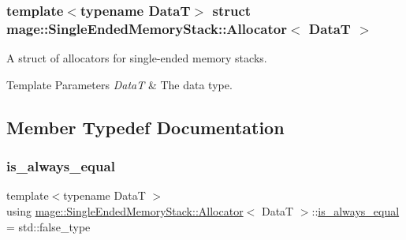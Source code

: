 \subsubsection*{template$<$typename DataT$>$\newline
struct mage\+::\+Single\+Ended\+Memory\+Stack\+::\+Allocator$<$ Data\+T $>$}

A struct of allocators for single-\/ended memory stacks.


\begin{DoxyTemplParams}{Template Parameters}
{\em DataT} & The data type. \\
\hline
\end{DoxyTemplParams}


\subsection{Member Typedef Documentation}
\hypertarget{structmage_1_1_single_ended_memory_stack_1_1_allocator_a64d005be12e9d1749c0e6eeea5107a98}{}\label{structmage_1_1_single_ended_memory_stack_1_1_allocator_a64d005be12e9d1749c0e6eeea5107a98} 
\subsubsection{\texorpdfstring{is\+\_\+always\+\_\+equal}{is\_always\_equal}}
{\footnotesize\ttfamily template$<$typename DataT $>$ \\
using \hyperlink{structmage_1_1_single_ended_memory_stack_1_1_allocator}{mage\+::\+Single\+Ended\+Memory\+Stack\+::\+Allocator}$<$ DataT $>$\+::\hyperlink{structmage_1_1_single_ended_memory_stack_1_1_allocator_a64d005be12e9d1749c0e6eeea5107a98}{is\+\_\+always\+\_\+equal} =  std\+::false\+\_\+type}

\hypertarget{structmage_1_1_single_ended_memory_stack_1_1_allocator_a408c0a4b29dc60e9564245c6a0a6fd4c}{}\label{structmage_1_1_single_ended_memory_stack_1_1_allocator_a408c0a4b29dc60e9564245c6a0a6fd4c} 
